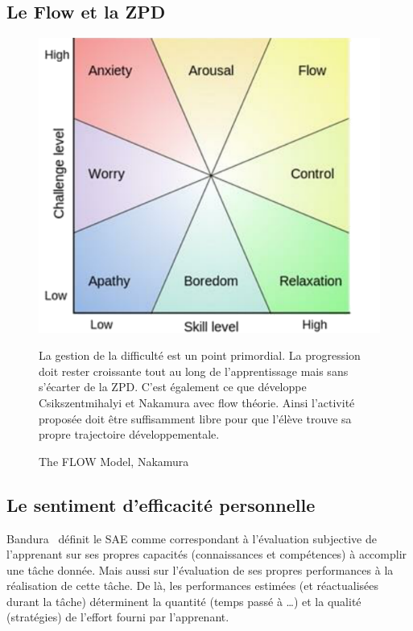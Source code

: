     \subsection{Le Flow et la ZPD}
        \strut
        \begin{figure}[!h]
          \begin{minipage}{0.325\linewidth}
              \includegraphics[width=\linewidth]{Figures/Nakamura-FlowModel.png}
              \caption{The FLOW Model, Nakamura~}\label{fig:FlowModel}
          \end{minipage}
          \hfill
          \begin{minipage}{0.6\linewidth}
          \myDefautStyle
              La gestion de la difficulté est un point primordial. La progression doit rester croissante tout au long de l'apprentissage mais sans s'écarter de la \glsdesc{ZPD}. C'est également ce que développe Csikszentmihalyi et Nakamura avec \glsdesc{flow} théorie. Ainsi l'activité proposée doit être suffisamment libre pour que l'élève trouve sa propre trajectoire développementale.
          \end{minipage}
        \end{figure}
    \subsection{Le sentiment d’efficacité personnelle}
        Bandura~ définit le \glsdesc{SAE} comme correspondant à l’évaluation subjective de l’apprenant sur ses propres capacités (connaissances et compétences) à accomplir une tâche donnée. Mais aussi sur l'évaluation de ses propres performances à la réalisation de cette tâche. De là, les performances estimées (et réactualisées durant la tâche) déterminent la quantité (temps passé à \dots) et la qualité  (stratégies) de l’effort fourni par l'apprenant.
